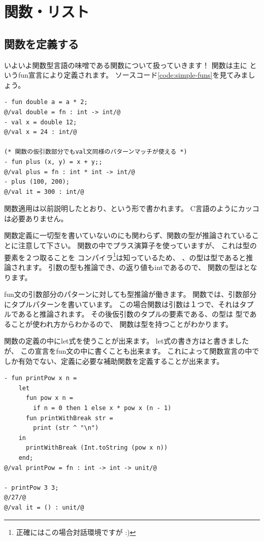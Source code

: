 \documentclass[11pt,a4paper]{article}
\begin{document}
\section{関数・リスト}
\subsection{関数を定義する}
いよいよ関数型言語の味噌である関数について扱っていきます！
関数は主に
というfun宣言により定義されます。
ソースコード\ref{code:simple-funs}を見てみましょう。

\begin{lstlisting}[caption={単純な関数の定義},label={code:simple-funs}]
- fun double a = a * 2;
@/val double = fn : int -> int/@
- val x = double 12;
@/val x = 24 : int/@

(* 関数の仮引数部分でもval文同様のパターンマッチが使える *)
- fun plus (x, y) = x + y;;
@/val plus = fn : int * int -> int/@
- plus (100, 200);
@/val it = 300 : int/@
\end{lstlisting}

関数適用は以前説明したとおり、という形で書かれます。
C言語のようにカッコは必要ありません。

関数定義に一切型を書いていないのにも関わらず、関数の型が推論されていることに注意して下さい。
関数の中でプラス演算子を使っていますが、
これは型の要素を２つ取ることを
コンパイラ\footnote{正確にはこの場合対話環境ですが :)}は知っているため、
、の型は型であると推論されます。
引数の型も推論でき、の返り値もintであるので、
関数の型はとなります。

fun文の引数部分のパターンに対しても型推論が働きます。
関数では、引数部分にタプルパターンを書いています。
この場合関数は引数は１つで、それはタプルであると推論されます。
その後仮引数のタプルの要素である、の型は
型であることが使われ方からわかるので、
関数は型を持つことがわかります。

関数の定義の中にlet式を使うことが出来ます。
let式の書き方はと書きましたが、
この宣言をfun文の中に書くことも出来ます。
これによって関数宣言の中でしか有効でない、定義に必要な補助関数を定義することが出来ます。

\begin{lstlisting}[caption=ネストした関数宣言,label=code:nested-fun]
- fun printPow x n =
    let
      fun pow x n =
        if n = 0 then 1 else x * pow x (n - 1)
      fun printWithBreak str =
        print (str ^ "\n")
    in
      printWithBreak (Int.toString (pow x n))
    end;
@/val printPow = fn : int -> int -> unit/@

- printPow 3 3;
@/27/@
@/val it = () : unit/@
\end{lstlisting}
\end{document}
